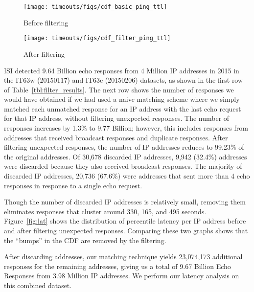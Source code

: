 \begin{figure*}[tb]
\begin{subfigure}[t]{0.47\linewidth}
\centering
\texttt{[image: timeouts/figs/cdf\_basic\_ping\_ttl]}
\caption{
\label{fig:basic_lat}
Before filtering
}
\end{subfigure}
%
\hfill
%
\begin{subfigure}[t]{0.47\linewidth}
\centering
\texttt{[image: timeouts/figs/cdf\_filter\_ping\_ttl]}
\caption{
\label{fig:filter_lat}
After filtering
}
\end{subfigure}
\caption{
\label{fig:lat} 
CDF of Percentile latency per IP address before and after filtering
  unexpected responses. Each point represents an IP address and each
  color represents the percentile from that IP address's response
  latencies. Before filtering unexpected responses, there are
  bumps caused by broadcast responses at 330s, 165s and 495s,
  fractions of the 11 minute (660s) probing interval.
}
\end{figure*}


ISI detected 9.64 Billion echo responses from 4 Million IP addresses in 2015
in the IT63w (20150117) and IT63c (20150206) datasets, as shown in the
first row of Table~\ref{tbl:filter_results}.
The next row shows the number of responses we would have obtained
if we had used a naive matching scheme where we simply matched each
unmatched response for an IP address with the last echo request for
that IP
address, without filtering unexpected responses.
The number of responses
increases by 1.3\% to 9.77 Billion; however, this includes responses
from addresses that received broadcast responses and duplicate
responses. 
%
After filtering unexpected responses, the number of IP addresses
reduces to 99.23\% of
the original addresses. 
%
Of 30,678 discarded IP addresses, 9,942 (32.4\%)
addresses were discarded because they also received broadcast
responses. 
%
The majority of discarded IP addresses, 20,736 (67.6\%) were addresses that
sent more than 4 echo responses in response to a single echo request. 

Though the number of discarded IP addresses is relatively small, removing
them eliminates responses that cluster around 330, 165, and 495 seconds.
Figure~\ref{fig:lat} shows the distribution of percentile latency per
IP address before and after filtering unexpected responses.  Comparing
these two graphs shows that the ``bumps'' in the CDF are removed by the filtering.

After discarding addresses, our matching technique yields 23,074,173
additional responses for the remaining addresses, giving us a total of
9.67 Billion Echo Responses from 3.98 Million IP addresses. We perform
our latency analysis on this combined dataset.

